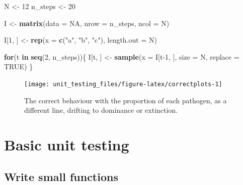 \documentclass[]{elsarticle} %
\newenvironment{Shaded}{\begin{snugshade}}{\end{snugshade}}
\newcommand{\ControlFlowTok}[1]{\textcolor[rgb]{0.13,0.29,0.53}{\textbf{#1}}}
\newcommand{\DataTypeTok}[1]{\textcolor[rgb]{0.13,0.29,0.53}{#1}}
\newcommand{\DecValTok}[1]{\textcolor[rgb]{0.00,0.00,0.81}{#1}}
\newcommand{\KeywordTok}[1]{\textcolor[rgb]{0.13,0.29,0.53}{\textbf{#1}}}
\newcommand{\NormalTok}[1]{#1}
\newcommand{\OtherTok}[1]{\textcolor[rgb]{0.56,0.35,0.01}{#1}}
\newcommand{\StringTok}[1]{\textcolor[rgb]{0.31,0.60,0.02}{#1}}
\begin{document}
\begin{Shaded}
\begin{Highlighting}[]
\NormalTok{N <-}\StringTok{ }\DecValTok{12}
\NormalTok{n_steps <-}\StringTok{ }\DecValTok{20}

\NormalTok{I <-}\StringTok{ }\KeywordTok{matrix}\NormalTok{(}\DataTypeTok{data =} \OtherTok{NA}\NormalTok{, }\DataTypeTok{nrow =}\NormalTok{ n_steps, }\DataTypeTok{ncol =}\NormalTok{ N)}

\NormalTok{I[}\DecValTok{1}\NormalTok{, ] <-}\StringTok{ }\KeywordTok{rep}\NormalTok{(}\DataTypeTok{x =} \KeywordTok{c}\NormalTok{(}\StringTok{"a"}\NormalTok{, }\StringTok{"b"}\NormalTok{, }\StringTok{"c"}\NormalTok{), }\DataTypeTok{length.out =}\NormalTok{ N)}

\ControlFlowTok{for}\NormalTok{(t }\ControlFlowTok{in} \KeywordTok{seq}\NormalTok{(}\DecValTok{2}\NormalTok{, n_steps))\{}
\NormalTok{  I[t, ] <-}\StringTok{ }\KeywordTok{sample}\NormalTok{(}\DataTypeTok{x =}\NormalTok{ I[t}\DecValTok{-1}\NormalTok{, ], }\DataTypeTok{size =}\NormalTok{ N, }\DataTypeTok{replace =} \OtherTok{TRUE}\NormalTok{)}
\NormalTok{\}}
\end{Highlighting}
\end{Shaded}

\begin{figure}[h]

{\centering \texttt{[image: unit\_testing\_files/figure-latex/correctplots-1]} 

}

\caption{The correct behaviour with the proportion of each pathogen, as a different line, drifting to dominance or extinction.}\label{fig:correctplots}
\end{figure}

\hypertarget{basic-unit-testing}{%
\section{Basic unit testing}\label{basic-unit-testing}}

\hypertarget{compactfuns}{%
\subsection*{Write small functions}\label{compactfuns}}
\end{document}
